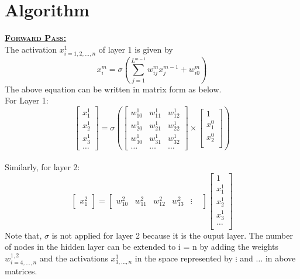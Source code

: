 \documentclass[a4paper,11pt]{article}
\begin{document}
\section{Algorithm}
\large{\textbf{\underline{\textsc{Forward Pass:}}}}\\
The activation $x^1_{i = 1,2,...,n}$ of layer 1 is given by \\
\begin{equation} 
 x_i^m = \sigma
 \left(
 \sum_{j=1}^{L^{m-1}} w_{ij}^m x_j^{m-1} + w_{i0}^m
 \right)
\end{equation}
The above equation can be written in matrix form as below.\\
For Layer 1:
$$
\left[
\begin{matrix}
	x_1^1 \\ x_2^1 \\ x_3^1 \\\hdots
	\end{matrix}
\right]
=
\sigma
\left(
\left[
\begin{matrix}
	w_{10}^1 & w_{11}^1 & w_{12}^1\\
	w_{20 }^1& w_{21}^1 & w_{22}^1 \\
	w_{30}^1 & w_{31}^1 & w_{32}^1\\
	\hdots & \hdots & \hdots
\end{matrix}
\right]
\times
\left[
\begin{matrix}
	1\\ x_1^0 \\x_2^0\\
\end{matrix}
\right]
\right)
$$
\\
Similarly, for layer 2:
$$
\left[
\begin{matrix}
	x_{1}^2
\end{matrix}
\right]
=
\left[
\begin{matrix}
w_{10}^2 & w_{11}^2 & w_{12}^2 & w_{13}^2  & \vdots &
\end{matrix}
\right]
\left[
\begin{matrix}
1\\x_1^1\\x_2^1\\x_3^1 \\ \hdots \\  
\end{matrix}
\right]
$$
Note that, $\sigma$ is not applied for layer 2 because it is the ouput layer.
The number of nodes in the hidden layer can be extended to i = n by adding the weights $w^{1,2}_{i=4,...,n}$ and the activations $x^{1}_{3,...,n}$ in the space represented by $\vdots$ and $\hdots$ in above matrices.\\\\
\end{document}
